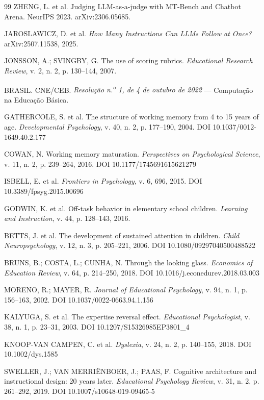 \documentclass[11pt,a4paper]{article}
\begin{document}
\begin{thebibliography}{99}
ZHENG, L. et al. Judging LLM-as-a-judge with MT-Bench and Chatbot Arena. NeurIPS 2023.
arXiv:2306.05685.

JAROSLAWICZ, D. et al. \textit{How Many Instructions Can LLMs Follow at Once?} arXiv:2507.11538, 2025.

JONSSON, A.; SVINGBY, G. The use of scoring rubrics. \textit{Educational Research Review}, v. 2,
n. 2, p. 130--144, 2007.

BRASIL. CNE/CEB. \textit{Resolução n.\textsuperscript{o} 1, de 4 de outubro de 2022} --- Computação
na Educação Básica.

GATHERCOLE, S. et al. The structure of working memory from 4 to 15 years of age.
\textit{Developmental Psychology}, v. 40, n. 2, p. 177--190, 2004. DOI 10.1037/0012-1649.40.2.177

COWAN, N. Working memory maturation. \textit{Perspectives on Psychological Science}, v. 11, n. 2,
p. 239--264, 2016. DOI 10.1177/1745691615621279

ISBELL, E. et al. \textit{Frontiers in Psychology}, v. 6, 696, 2015. DOI 10.3389/fpsyg.2015.00696

GODWIN, K. et al. Off-task behavior in elementary school children. \textit{Learning and
Instruction}, v. 44, p. 128--143, 2016.

BETTS, J. et al. The development of sustained attention in children. \textit{Child
Neuropsychology}, v. 12, n. 3, p. 205--221, 2006. DOI 10.1080/09297040500488522

BRUNS, B.; COSTA, L.; CUNHA, N. Through the looking glass. \textit{Economics of Education Review},
v. 64, p. 214--250, 2018. DOI 10.1016/j.econedurev.2018.03.003

MORENO, R.; MAYER, R. \textit{Journal of Educational Psychology}, v. 94, n. 1, p. 156--163, 2002.
DOI 10.1037/0022-0663.94.1.156

KALYUGA, S. et al. The expertise reversal effect. \textit{Educational Psychologist}, v. 38, n. 1,
p. 23--31, 2003. DOI 10.1207/S15326985EP3801\_4

KNOOP-VAN CAMPEN, C. et al. \textit{Dyslexia}, v. 24, n. 2, p. 140--155, 2018. DOI 10.1002/dys.1585

SWELLER, J.; VAN MERRIËNBOER, J.; PAAS, F. Cognitive architecture and instructional design: 20 years
later. \textit{Educational Psychology Review}, v. 31, n. 2, p. 261--292, 2019.
DOI 10.1007/s10648-019-09465-5


\end{thebibliography}
\end{document}
